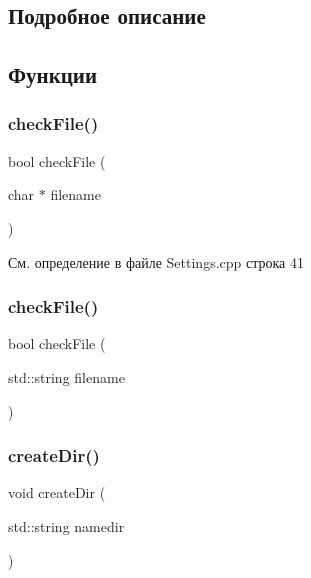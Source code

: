 \subsection{Подробное описание}


\subsection{Функции}
\mbox{\label{group__settingsh_ga2dd1bc039652a0480c444957d416b6a6}} 
\subsubsection{\texorpdfstring{check\+File()}{checkFile()}\hspace{0.1cm}{\footnotesize\ttfamily [1/2]}}
{\footnotesize\ttfamily bool check\+File (\begin{DoxyParamCaption}\item[{char $\ast$}]{filename }\end{DoxyParamCaption})}



См. определение в файле Settings.\+cpp строка 41

\mbox{\label{group__settingsh_ga147bed619c6314e960320c1bcb40ed91}} 
\subsubsection{\texorpdfstring{check\+File()}{checkFile()}\hspace{0.1cm}{\footnotesize\ttfamily [2/2]}}
{\footnotesize\ttfamily bool check\+File (\begin{DoxyParamCaption}\item[{std\+::string}]{filename }\end{DoxyParamCaption})}

\mbox{\label{group__settingsh_ga912b67f6f6b05abadd055a379dd84864}} 
\subsubsection{\texorpdfstring{create\+Dir()}{createDir()}}
{\footnotesize\ttfamily void create\+Dir (\begin{DoxyParamCaption}\item[{std\+::string}]{namedir }\end{DoxyParamCaption})}

